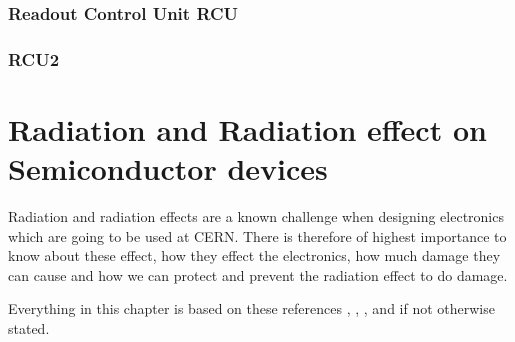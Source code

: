 \documentclass[12pt]{article}
\numberwithin{figure}{section}
\begin{document}
\subsubsection{Readout Control Unit RCU}

\subsubsection{RCU2}



\FloatBarrier
\newpage



\section{Radiation and Radiation effect on Semiconductor devices}
Radiation and radiation effects are a known challenge when designing electronics which are going to be used at CERN.
There is therefore of highest importance to know about these effect, how they effect the electronics, how much damage they can cause and how we can protect and prevent the radiation effect to do damage.

Everything in this chapter is based on these references \cite{rad_phys}, \cite{Weste_harris}, \cite{knoll}, \cite{Baumann} and \cite{balashov} if not otherwise stated.
\end{document}
